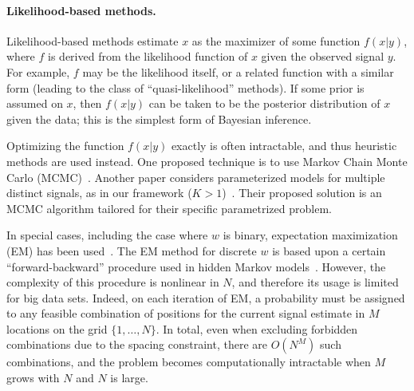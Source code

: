 \documentclass[english,11pt]{article}
\newcommand{\1}{\mathbf{1}}
\numberwithin{equation}{section}
\theoremstyle{plain}
\theoremstyle{definition}
\theoremstyle{remark}
\theoremstyle{plain}
\theoremstyle{remark}
\theoremstyle{plain}
\theoremstyle{plain}
\begin{document}


\paragraph{Likelihood-based methods.}

Likelihood-based methods estimate $x$ as the maximizer of some function $f(x | y)$, where $f$ is derived from the likelihood function of $x$ given the observed signal $y$. For example, $f$ may be the likelihood itself, or a related function with a similar form (leading to the class of ``quasi-likelihood'' methods). If some prior is assumed on $x$, then $f(x|y)$ can be taken to be the posterior distribution of $x$ given the data; this is the simplest form of Bayesian inference.

Optimizing the function $f(x|y)$ exactly is often intractable, and thus heuristic methods are used instead. One proposed technique is to use Markov Chain Monte Carlo (MCMC)~\cite{cappe1999simulation}. Another paper considers parameterized models for multiple distinct signals, as in our framework ($K>1$)~\cite{andrieu2001bayesian}. Their proposed solution is an MCMC algorithm tailored for their specific parametrized problem. 

In special cases, including the case where $w$ is binary, expectation maximization (EM) has been used~\cite{cappe1999simulation}. The EM method for discrete $w$ is based upon a certain ``forward-backward'' procedure used in hidden Markov models~\cite{rabiner1989tutorial}. However, the complexity of this procedure is nonlinear in $N$, and therefore its usage is limited for big data sets. 
%
%
Indeed, on each iteration of EM, a probability must be assigned to any feasible combination of positions for the current signal estimate in $M$ locations on the grid $\{1,\ldots,N\}$.
In total, even when excluding forbidden combinations due to the spacing constraint, there are $O(N^M)$ such combinations, and the problem becomes computationally intractable when $M$ grows with $N$ and $N$ is large.
\end{document}
